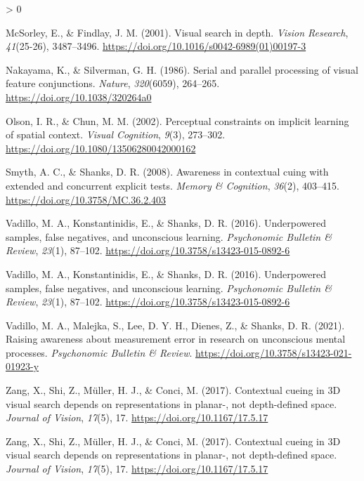 \documentclass[
  english,
  man,floatsintext]{apa7}
\newlength{\cslhangindent}
\newenvironment{CSLReferences}[2] %
 {%
  \setlength{\parindent}{0pt}
  \ifodd #1 \everypar{\setlength{\hangindent}{\cslhangindent}}\ignorespaces\fi
  \ifnum #2 > 0
  \setlength{\parskip}{#2\baselineskip}
  \fi
 }%
 {}
\begin{document}
\begin{CSLReferences}{1}{0}
\leavevmode\hypertarget{ref-mcsorley2001}{}%
McSorley, E., \& Findlay, J. M. (2001). Visual search in depth. \emph{Vision Research}, \emph{41}(25-26), 3487--3496. \url{https://doi.org/10.1016/s0042-6989(01)00197-3}

\leavevmode\hypertarget{ref-nakayama1986}{}%
Nakayama, K., \& Silverman, G. H. (1986). Serial and parallel processing of visual feature conjunctions. \emph{Nature}, \emph{320}(6059), 264--265. \url{https://doi.org/10.1038/320264a0}

\leavevmode\hypertarget{ref-olson2002}{}%
Olson, I. R., \& Chun, M. M. (2002). Perceptual constraints on implicit learning of spatial context. \emph{Visual Cognition}, \emph{9}(3), 273--302. \url{https://doi.org/10.1080/13506280042000162}

\leavevmode\hypertarget{ref-smyth2008}{}%
Smyth, A. C., \& Shanks, D. R. (2008). Awareness in contextual cuing with extended and concurrent explicit tests. \emph{Memory \& Cognition}, \emph{36}(2), 403--415. \url{https://doi.org/10.3758/MC.36.2.403}

\leavevmode\hypertarget{ref-vadillo2016}{}%
Vadillo, M. A., Konstantinidis, E., \& Shanks, D. R. (2016). Underpowered samples, false negatives, and unconscious learning. \emph{Psychonomic Bulletin \& Review}, \emph{23}(1), 87--102. \url{https://doi.org/10.3758/s13423-015-0892-6}

\leavevmode\hypertarget{ref-vadillo2016}{}%
Vadillo, M. A., Konstantinidis, E., \& Shanks, D. R. (2016). Underpowered samples, false negatives, and unconscious learning. \emph{Psychonomic Bulletin \& Review}, \emph{23}(1), 87--102. \url{https://doi.org/10.3758/s13423-015-0892-6}

\leavevmode\hypertarget{ref-vadillo2021}{}%
Vadillo, M. A., Malejka, S., Lee, D. Y. H., Dienes, Z., \& Shanks, D. R. (2021). Raising awareness about measurement error in research on unconscious mental processes. \emph{Psychonomic Bulletin \& Review}. \url{https://doi.org/10.3758/s13423-021-01923-y}

\leavevmode\hypertarget{ref-zang2017}{}%
Zang, X., Shi, Z., Müller, H. J., \& Conci, M. (2017). Contextual cueing in 3D visual search depends on representations in planar-, not depth-defined space. \emph{Journal of Vision}, \emph{17}(5), 17. \url{https://doi.org/10.1167/17.5.17}

\leavevmode\hypertarget{ref-zang2017}{}%
Zang, X., Shi, Z., Müller, H. J., \& Conci, M. (2017). Contextual cueing in 3D visual search depends on representations in planar-, not depth-defined space. \emph{Journal of Vision}, \emph{17}(5), 17. \url{https://doi.org/10.1167/17.5.17}

\end{CSLReferences}
\end{document}
